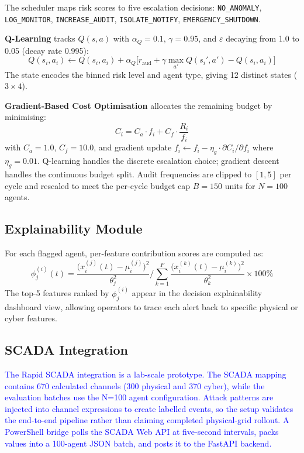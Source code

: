 \documentclass[conference,a4paper]{IEEEtran}
\begin{document}
The scheduler maps risk scores to five escalation decisions: \texttt{NO\_ANOMALY}, \texttt{LOG\_MONITOR}, \texttt{INCREASE\_AUDIT}, \texttt{ISOLATE\_NOTIFY}, \texttt{EMERGENCY\_SHUTDOWN}.

\textbf{Q-Learning} tracks $Q(s,a)$ with $\alpha_Q=0.1$, $\gamma=0.95$, and $\varepsilon$ decaying from 1.0 to 0.05 (decay rate 0.995):
\begin{equation}
Q(s_i, a_i) \leftarrow Q(s_i, a_i) + \alpha_Q\bigl[r_{\text{aud}} + \gamma \max_{a'} Q(s_i', a') - Q(s_i, a_i)\bigr]
\label{eq:qlearn}
\end{equation}
The state encodes the binned risk level and agent type, giving 12 distinct states ($3 \times 4$).

\textbf{Gradient-Based Cost Optimisation} allocates the remaining budget by minimising:
\begin{equation}
C_i = C_a \cdot f_i + C_f \cdot \frac{R_i}{f_i}
\label{eq:cost}
\end{equation}
with $C_a=1.0$, $C_f=10.0$, and gradient update $f_i \leftarrow f_i - \eta_g \cdot \partial C_i / \partial f_i$ where $\eta_g = 0.01$. Q-learning handles the discrete escalation choice; gradient descent handles the continuous budget split. Audit frequencies are clipped to $[1, 5]$ per cycle and rescaled to meet the per-cycle budget cap $B=150$ units for $N=100$ agents.

\subsection{Explainability Module}

For each flagged agent, per-feature contribution scores are computed as:
\begin{equation}
\phi_j^{(i)}(t) = \frac{\bigl(x_i^{(j)}(t) - \mu_i^{(j)}\bigr)^2}{\theta_j^2} \Bigg/ \sum_{k=1}^{F} \frac{\bigl(x_i^{(k)}(t) - \mu_i^{(k)}\bigr)^2}{\theta_k^2} \times 100\%
\label{eq:explain}
\end{equation}
The top-5 features ranked by $\phi_j^{(i)}$ appear in the decision explainability dashboard view, allowing operators to trace each alert back to specific physical or cyber features.

\subsection{SCADA Integration}

\textcolor{blue}{The Rapid SCADA integration is a lab-scale prototype. The SCADA mapping contains 670 calculated channels (300 physical and 370 cyber), while the evaluation batches use the N=100 agent configuration. Attack patterns are injected into channel expressions to create labelled events, so the setup validates the end-to-end pipeline rather than claiming completed physical-grid rollout. A PowerShell bridge polls the SCADA Web API at five-second intervals, packs values into a 100-agent JSON batch, and posts it to the FastAPI backend.}
\end{document}
